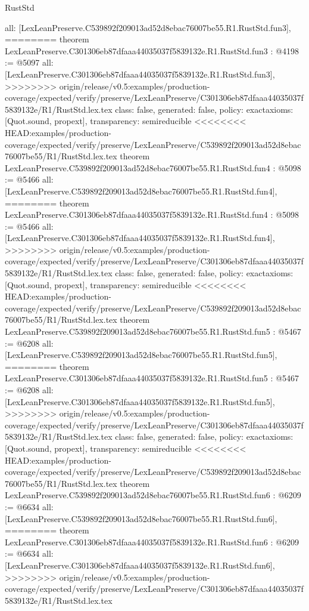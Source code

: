 \begin{lexlean}{RustStd}
\begin{coremodule}
{\begin{coremodule}
{{{{{{  all: [LexLeanPreserve.C539892f209013ad52d8ebac76007be55.R1.RustStd.fun3],
========
theorem LexLeanPreserve.C301306eb87dfaaa44035037f5839132e.R1.RustStd.fun3 : @4198 := @5097 {
  all: [LexLeanPreserve.C301306eb87dfaaa44035037f5839132e.R1.RustStd.fun3],
>>>>>>>> origin/release/v0.5:examples/production-coverage/expected/verify/preserve/LexLeanPreserve/C301306eb87dfaaa44035037f5839132e/R1/RustStd.lex.tex
  class: false,
  generated: false,
  policy: exact{axioms: [Quot.sound, propext]},
  transparency: semireducible
}
<<<<<<<< HEAD:examples/production-coverage/expected/verify/preserve/LexLeanPreserve/C539892f209013ad52d8ebac76007be55/R1/RustStd.lex.tex
theorem LexLeanPreserve.C539892f209013ad52d8ebac76007be55.R1.RustStd.fun4 : @5098 := @5466 {
  all: [LexLeanPreserve.C539892f209013ad52d8ebac76007be55.R1.RustStd.fun4],
========
theorem LexLeanPreserve.C301306eb87dfaaa44035037f5839132e.R1.RustStd.fun4 : @5098 := @5466 {
  all: [LexLeanPreserve.C301306eb87dfaaa44035037f5839132e.R1.RustStd.fun4],
>>>>>>>> origin/release/v0.5:examples/production-coverage/expected/verify/preserve/LexLeanPreserve/C301306eb87dfaaa44035037f5839132e/R1/RustStd.lex.tex
  class: false,
  generated: false,
  policy: exact{axioms: [Quot.sound, propext]},
  transparency: semireducible
}
<<<<<<<< HEAD:examples/production-coverage/expected/verify/preserve/LexLeanPreserve/C539892f209013ad52d8ebac76007be55/R1/RustStd.lex.tex
theorem LexLeanPreserve.C539892f209013ad52d8ebac76007be55.R1.RustStd.fun5 : @5467 := @6208 {
  all: [LexLeanPreserve.C539892f209013ad52d8ebac76007be55.R1.RustStd.fun5],
========
theorem LexLeanPreserve.C301306eb87dfaaa44035037f5839132e.R1.RustStd.fun5 : @5467 := @6208 {
  all: [LexLeanPreserve.C301306eb87dfaaa44035037f5839132e.R1.RustStd.fun5],
>>>>>>>> origin/release/v0.5:examples/production-coverage/expected/verify/preserve/LexLeanPreserve/C301306eb87dfaaa44035037f5839132e/R1/RustStd.lex.tex
  class: false,
  generated: false,
  policy: exact{axioms: [Quot.sound, propext]},
  transparency: semireducible
}
<<<<<<<< HEAD:examples/production-coverage/expected/verify/preserve/LexLeanPreserve/C539892f209013ad52d8ebac76007be55/R1/RustStd.lex.tex
theorem LexLeanPreserve.C539892f209013ad52d8ebac76007be55.R1.RustStd.fun6 : @6209 := @6634 {
  all: [LexLeanPreserve.C539892f209013ad52d8ebac76007be55.R1.RustStd.fun6],
========
theorem LexLeanPreserve.C301306eb87dfaaa44035037f5839132e.R1.RustStd.fun6 : @6209 := @6634 {
  all: [LexLeanPreserve.C301306eb87dfaaa44035037f5839132e.R1.RustStd.fun6],
>>>>>>>> origin/release/v0.5:examples/production-coverage/expected/verify/preserve/LexLeanPreserve/C301306eb87dfaaa44035037f5839132e/R1/RustStd.lex.tex
}}}}}}}}}}
\end{coremodule}}
\end{coremodule}
\end{lexlean}
